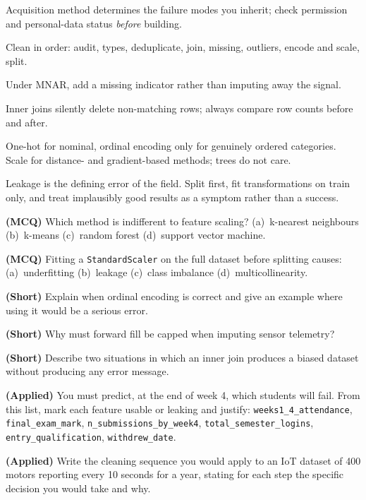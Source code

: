 \begin{chaptersummary}
\begin{tight}
  \item Acquisition method determines the failure modes you inherit; check
        permission and personal-data status \emph{before} building.
  \item Clean in order: audit, types, deduplicate, join, missing, outliers, encode
        and scale, split.
  \item Under MNAR, add a missing indicator rather than imputing away the signal.
  \item Inner joins silently delete non-matching rows; always compare row counts
        before and after.
  \item One-hot for nominal, ordinal encoding only for genuinely ordered
        categories. Scale for distance- and gradient-based methods; trees do not
        care.
  \item Leakage is the defining error of the field. Split first, fit
        transformations on train only, and treat implausibly good results as a
        symptom rather than a success.
\end{tight}
\end{chaptersummary}

\begin{reviewq}
  \item \textbf{(MCQ)} Which method is indifferent to feature scaling?
        (a)~k-nearest neighbours (b)~k-means (c)~random forest (d)~support vector machine.
  \item \textbf{(MCQ)} Fitting a \texttt{StandardScaler} on the full dataset before
        splitting causes: (a)~underfitting (b)~leakage (c)~class imbalance
        (d)~multicollinearity.
  \item \textbf{(Short)} Explain when ordinal encoding is correct and give an example
        where using it would be a serious error.
  \item \textbf{(Short)} Why must forward fill be capped when imputing sensor
        telemetry?
  \item \textbf{(Short)} Describe two situations in which an inner join produces a
        biased dataset without producing any error message.
  \item \textbf{(Applied)} You must predict, at the end of week 4, which students
        will fail. From this list, mark each feature usable or leaking and justify:
        \texttt{weeks1\_4\_attendance}, \texttt{final\_exam\_mark},
        \texttt{n\_submissions\_by\_week4}, \texttt{total\_semester\_logins},
        \texttt{entry\_qualification}, \texttt{withdrew\_date}.
  \item \textbf{(Applied)} Write the cleaning sequence you would apply to an IoT
        dataset of 400 motors reporting every 10 seconds for a year, stating for
        each step the specific decision you would take and why.
\end{reviewq}

